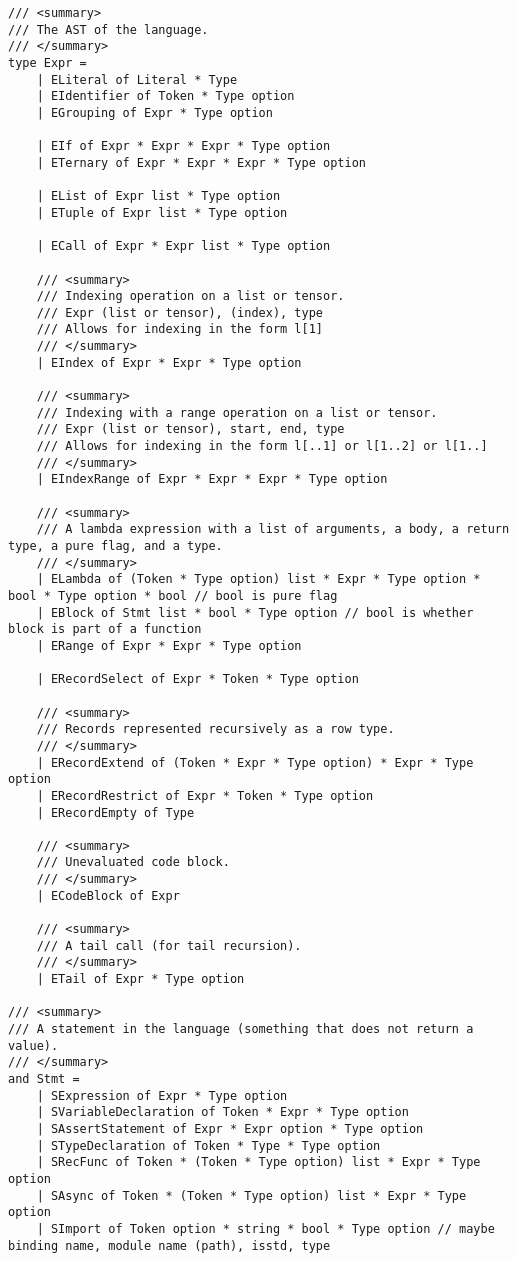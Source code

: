 \begin{verbatim}
/// <summary>
/// The AST of the language.
/// </summary>
type Expr =
    | ELiteral of Literal * Type
    | EIdentifier of Token * Type option
    | EGrouping of Expr * Type option

    | EIf of Expr * Expr * Expr * Type option
    | ETernary of Expr * Expr * Expr * Type option

    | EList of Expr list * Type option
    | ETuple of Expr list * Type option

    | ECall of Expr * Expr list * Type option

    /// <summary>
    /// Indexing operation on a list or tensor.
    /// Expr (list or tensor), (index), type
    /// Allows for indexing in the form l[1]
    /// </summary>
    | EIndex of Expr * Expr * Type option

    /// <summary>
    /// Indexing with a range operation on a list or tensor.
    /// Expr (list or tensor), start, end, type
    /// Allows for indexing in the form l[..1] or l[1..2] or l[1..]
    /// </summary>
    | EIndexRange of Expr * Expr * Expr * Type option

    /// <summary>
    /// A lambda expression with a list of arguments, a body, a return type, a pure flag, and a type.
    /// </summary>
    | ELambda of (Token * Type option) list * Expr * Type option * bool * Type option * bool // bool is pure flag
    | EBlock of Stmt list * bool * Type option // bool is whether block is part of a function
    | ERange of Expr * Expr * Type option

    | ERecordSelect of Expr * Token * Type option

    /// <summary>
    /// Records represented recursively as a row type.
    /// </summary>
    | ERecordExtend of (Token * Expr * Type option) * Expr * Type option
    | ERecordRestrict of Expr * Token * Type option
    | ERecordEmpty of Type

    /// <summary>
    /// Unevaluated code block.
    /// </summary>
    | ECodeBlock of Expr

    /// <summary>
    /// A tail call (for tail recursion).
    /// </summary>
    | ETail of Expr * Type option

/// <summary>
/// A statement in the language (something that does not return a value).
/// </summary>
and Stmt =
    | SExpression of Expr * Type option
    | SVariableDeclaration of Token * Expr * Type option
    | SAssertStatement of Expr * Expr option * Type option
    | STypeDeclaration of Token * Type * Type option
    | SRecFunc of Token * (Token * Type option) list * Expr * Type option
    | SAsync of Token * (Token * Type option) list * Expr * Type option
    | SImport of Token option * string * bool * Type option // maybe binding name, module name (path), isstd, type
\end{verbatim}